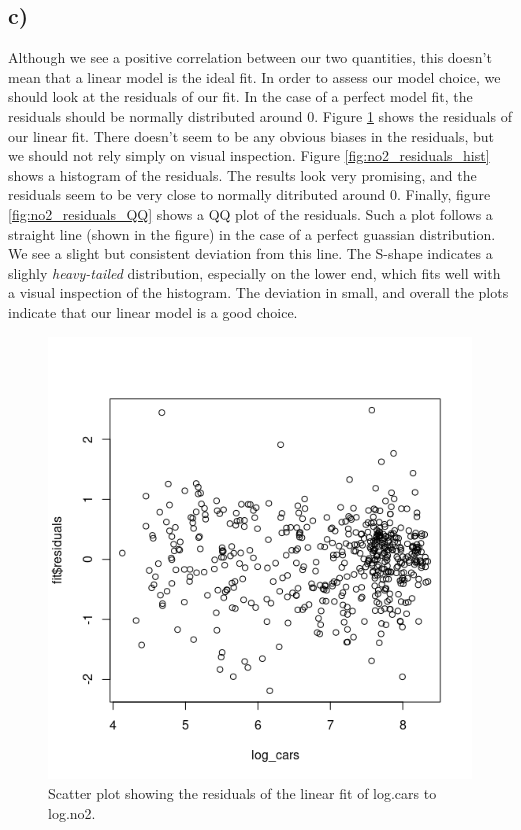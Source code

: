 \documentclass[a4paper, twocolumn]{article}
\begin{document}
\subsection*{c)}
Although we see a positive correlation between our two quantities, this doesn't mean that a linear model is the ideal fit. In order to assess our model choice, we should look at the residuals of our fit. In the case of a perfect model fit, the residuals should be normally distributed around 0. Figure \ref{fig:no2_residuals_plot} shows the residuals of our linear fit. There doesn't seem to be any obvious biases in the residuals, but we should not rely simply on visual inspection. Figure \ref{fig:no2_residuals_hist} shows a histogram of the residuals. The results look very promising, and the residuals seem to be very close to normally ditributed around 0. Finally, figure \ref{fig:no2_residuals_QQ} shows a QQ plot of the residuals. Such a plot follows a straight line (shown in the figure) in the case of a perfect guassian distribution. We see a slight but consistent deviation from this line. The S-shape indicates a slighly \textit{heavy-tailed} distribution, especially on the lower end, which fits well with a visual inspection of the histogram. The deviation in small, and overall the plots indicate that our linear model is a good choice.

\begin{figure}[h!]
    \centering
    \includegraphics[width=0.7\linewidth]{figures/no2_residuals_plot.png}
    \caption{Scatter plot showing the residuals of the linear fit of log.cars to log.no2.}
    \label{fig:no2_residuals_plot}
\end{figure}
\end{document}
